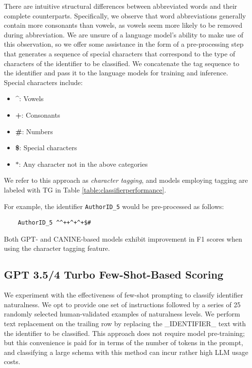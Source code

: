 There are intuitive structural differences between abbreviated words and their complete counterparts.
Specifically, we observe that word abbreviations generally contain more consonants than vowels, as vowels seem more likely to be removed during abbreviation.
We are unsure of a language model's ability to make use of this observation, so we offer some assistance in the form of a pre-processing step that generates a sequence of special characters that correspond to the type of characters of the identifier to be classified. 
We concatenate the tag sequence to the identifier and pass it to the language models for training and inference. Special characters include:
\begin{itemize}
  \item \textbf{\textasciicircum}: Vowels
  \item \textbf{+}: Consonants
  \item \textbf{\#}: Numbers
  \item \textbf{\$}: Special characters
  \item \textbf{$\ast$}: Any character not in the above categories
\end{itemize} 
We refer to this approach as \emph{character tagging}, and models employing tagging are labeled with TG in Table \ref{table:classifierperformance}.

For example, the identifier \texttt{AuthorID\_5} would be pre-processed as follows:

\begin{verbatim}
    AuthorID_5 ^^++^+^+$#
\end{verbatim}

Both GPT- and CANINE-based models exhibit improvement in F1 scores when using the character tagging feature.

\subsection{GPT 3.5/4 Turbo Few-Shot-Based Scoring}

We experiment with the effectiveness of few-shot prompting to classify identifier naturalness.
We opt to provide one set of instructions followed by a series of 25 randomly selected human-validated examples of naturalness levels.
We perform text replacement on the trailing row by replacing the \_IDENTIFIER\_ text with the identifier to be classified. 
This approach does not require model pre-training; but this convenience is paid for in terms of the number of tokens in the prompt, and classifying a large schema with this method can incur rather high LLM usage costs.

